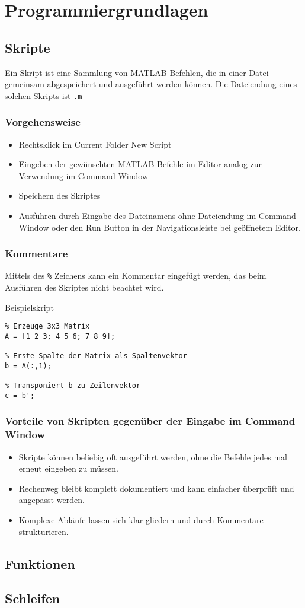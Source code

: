 \section{Programmiergrundlagen}
        \subsection{Skripte}
        Ein Skript ist eine Sammlung von MATLAB Befehlen, die in einer Datei gemeinsam abgespeichert und ausgeführt werden können. Die Dateiendung eines solchen Skripts ist \texttt{.m} 
        \subsubsection*{Vorgehensweise}
        \begin{itemize}
                \item Rechtsklick im Current Folder \textrightarrow New \textrightarrow Script
                \item Eingeben der gewünschten MATLAB Befehle im Editor analog zur Verwendung im Command Window
                \item Speichern des Skriptes
                \item Ausführen durch Eingabe des Dateinamens ohne Dateiendung im Command Window oder den Run Button in der Navigationsleiste bei geöffnetem Editor.
        \end{itemize}
        \subsubsection*{Kommentare}
        Mittels des \texttt{\%} Zeichens kann ein Kommentar eingefügt werden, das beim Ausführen des Skriptes nicht beachtet wird.
        \begin{Codelösung}{Beispielskript}
                \begin{lstlisting}
% Erzeuge 3x3 Matrix
A = [1 2 3; 4 5 6; 7 8 9];

% Erste Spalte der Matrix als Spaltenvektor
b = A(:,1);

% Transponiert b zu Zeilenvektor
c = b';
                \end{lstlisting}
        \end{Codelösung}
        \subsubsection*{Vorteile von Skripten gegenüber der Eingabe im Command Window}
        \begin{itemize}
                \item Skripte können beliebig oft ausgeführt werden, ohne die Befehle jedes mal erneut eingeben zu müssen.
                \item Rechenweg bleibt komplett dokumentiert und kann einfacher überprüft und angepasst werden.
                \item Komplexe Abläufe lassen sich klar gliedern und durch Kommentare strukturieren.
        \end{itemize}
        \subsection{Funktionen}
        \subsection{Schleifen}